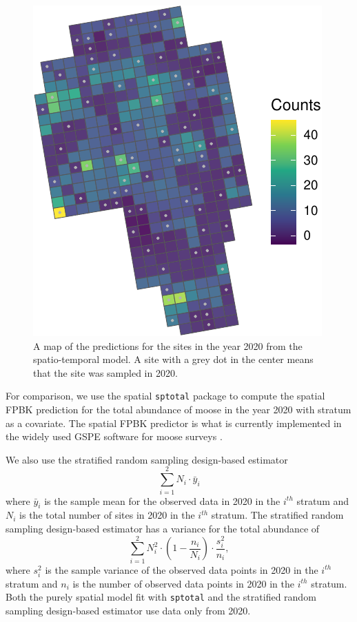 \documentclass[]{interact}
\theoremstyle{plain}%
\theoremstyle{definition}
\theoremstyle{remark}
\begin{document}
\begin{figure}
\centering
\includegraphics{fpspatiotemp_manu_files/figure-latex/unnamed-chunk-9-1.pdf}
\caption{\label{fig:sitepredmap} A map of the predictions for the sites
in the year 2020 from the spatio-temporal model. A site with a grey dot
in the center means that the site was sampled in 2020.}
\end{figure}

For comparison, we use the spatial \texttt{sptotal} package
\citep{higham2021sptotal} to compute the spatial FPBK prediction
\citep{ver2008spatial} for the total abundance of moose in the year 2020
with stratum as a covariate. The spatial FPBK predictor is what is
currently implemented in the widely used GSPE software for moose surveys
\citep{delong2006geospatial}.

We also use the stratified random sampling design-based estimator
\mbox{} \begin{equation*}
\sum_{i = 1}^{2} N_i \cdot \bar{y}_i
\end{equation*} \noindent where \(\bar{y}_i\) is the sample mean for the
observed data in 2020 in the \(i^{th}\) stratum and \(N_i\) is the total
number of sites in 2020 in the \(i^{th}\) stratum. The stratified random
sampling design-based estimator has a variance for the total abundance
of \mbox{} \begin{equation*}
\sum_{i = 1}^{2} N_i^2 \cdot (1 - \frac{n_i}{N_i}) \cdot \frac{s^2_i}{n_i},
\end{equation*} \noindent where \(s^2_i\) is the sample variance of the
observed data points in 2020 in the \(i^{th}\) stratum and \(n_i\) is
the number of observed data points in 2020 in the \(i^{th}\) stratum.
Both the purely spatial model fit with \texttt{sptotal} and the
stratified random sampling design-based estimator use data only from
2020.
\end{document}

